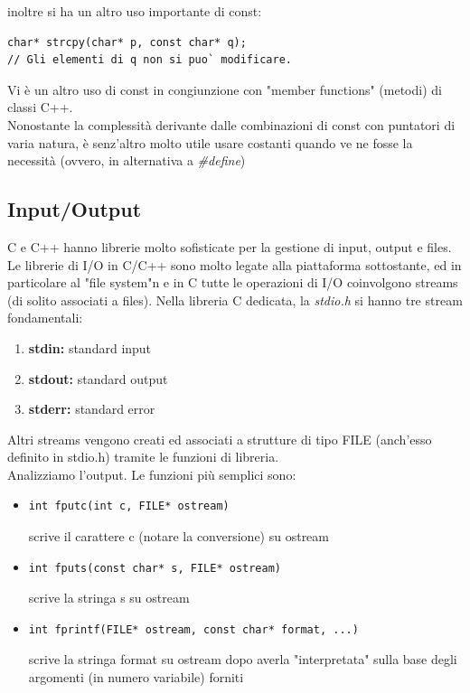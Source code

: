 \documentclass[a4paper,12pt, oneside]{book}
\begin{document}
	inoltre si ha un altro uso importante di const:
	\begin{verbatim}
char* strcpy(char* p, const char* q);
// Gli elementi di q non si puo` modificare.
\end{verbatim}
	Vi è un altro uso di const in congiunzione con "member functions" (metodi) di classi C++.\\
	Nonostante la complessità derivante dalle combinazioni di const con puntatori di varia natura, è senz'altro molto utile usare costanti quando ve ne fosse la necessità (ovvero, in alternativa a \textit{\#define})
	\subsection{Input/Output}
	C e C++ hanno librerie molto sofisticate per la gestione di input, output e files. Le librerie di I/O in C/C++ sono molto legate alla piattaforma
	sottostante, ed in particolare al "file system"n e in C tutte le operazioni di I/O coinvolgono streams (di solito
	associati a files). Nella libreria C dedicata, la \textit{stdio.h} si hanno tre stream fondamentali:
	\begin{enumerate}
		\item \textbf{stdin:} standard input
		\item \textbf{stdout:} standard output
		\item \textbf{stderr:} standard error
	\end{enumerate}
	Altri streams vengono creati ed associati a strutture di tipo FILE (anch'esso definito in stdio.h) tramite le funzioni di libreria.\\
	Analizziamo l'output. Le funzioni più semplici sono:
	\begin{itemize}
		\item \begin{verbatim}
int fputc(int c, FILE* ostream)
\end{verbatim}
		      scrive il carattere c (notare la conversione) su ostream

		\item \begin{verbatim}
int fputs(const char* s, FILE* ostream)
\end{verbatim}
		      scrive la stringa s su ostream
		\item \begin{verbatim}
int fprintf(FILE* ostream, const char* format, ...)\end{verbatim}
		      scrive la stringa format su ostream dopo averla "interpretata"
		      sulla base degli argomenti (in numero variabile) forniti
	\end{itemize}
\end{document}
